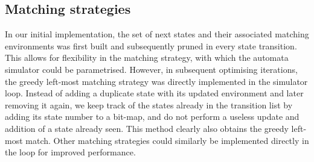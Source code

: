\subsection{Matching strategies}

In our initial implementation, the set of next states and their associated
matching environments was first built and subsequently pruned in every state
transition. This allows for flexibility in the matching strategy, with which the
automata simulator could be parametrised. However, in subsequent optimising
iterations, the greedy left-most matching strategy was directly implemented in
the simulator loop. Instead of adding a duplicate state with its updated
environment and later removing it again, we keep track of the states already in
the transition list by adding its state number to a bit-map, and do not perform
a useless update and addition of a state already seen. This method clearly also
obtains the greedy left-most match. Other matching strategies could similarly be
implemented directly in the loop for improved performance.


